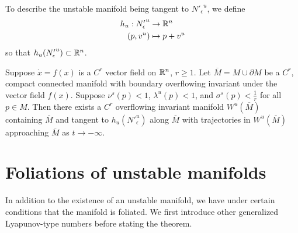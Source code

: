 To describe the unstable manifold being tangent to \({N'_\epsilon}^u\), we define 
\begin{equation*}
\begin{aligned}
	h_u : {N'_\epsilon}^u &\to \mathbb{R}^n \\
	(p, v^u) &\mapsto  p + v^u
\end{aligned}
\end{equation*}
so that \(h_u({N'_\epsilon}^u) \subset \mathbb{R}^n\).

\begin{theorem}\label{unstable-manifold-fenichel}
	Suppose \(\dot x = f(x)\) is a \(C^r\) vector field on \(\mathbb{R}^n\), \(r\geq 1\). Let \(\overline M = M \cup \partial M\) be a \(C^r\), compact connected manifold with boundary overflowing invariant under the vector field \(f(x)\). Suppose \(\nu^s(p) < 1\), \(\lambda^u(p) < 1\), and \(\sigma^s(p) < \frac 1 r\) for all \(p\in M\). Then there exists a \(C^r\) overflowing invariant manifold \(W^u(\overline M)\) containing \(\overline M\) and tangent to \(h_u(N'^u_\epsilon )\) along \(\overline M\) with trajectories in \(W^u(\overline M)\) approaching \(\overline M\) as \(t\to -\infty\).
\end{theorem}

\section{Foliations of unstable manifolds}

In addition to the existence of an unstable manifold, we have under certain conditions that the manifold is foliated. We first introduce other generalized Lyapunov-type numbers before stating the theorem.

